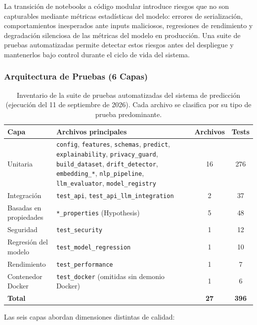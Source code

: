 \documentclass[12pt,letterpaper]{report}
\begin{document}
La transición de notebooks a código modular introduce riesgos que no son capturables mediante métricas estadísticas del modelo: errores de serialización, comportamientos inesperados ante inputs maliciosos, regresiones de rendimiento y degradación silenciosa de las métricas del modelo en producción. Una suite de pruebas automatizadas permite detectar estos riesgos antes del despliegue y mantenerlos bajo control durante el ciclo de vida del sistema.

\subsubsection{Arquitectura de Pruebas (6 Capas)}

\begin{table}[H]
\centering
\caption{Inventario de la suite de pruebas automatizadas del sistema de predicción
(ejecución del 11 de septiembre de 2026). Cada archivo se clasifica por su tipo de
prueba predominante.}
\label{tab:testing_suite}
\small
\begin{tabular}{@{}lp{6.3cm}cc@{}}
\toprule
\textbf{Capa} & \textbf{Archivos principales} & \textbf{Archivos} & \textbf{Tests} \\
\midrule
Unitaria & \texttt{config}, \texttt{features}, \texttt{schemas},
\texttt{predict}, \texttt{explainability}, \texttt{privacy\_guard},
\texttt{build\_dataset}, \texttt{drift\_detector}, \texttt{embedding\_*},
\texttt{nlp\_pipeline}, \texttt{llm\_evaluator}, \texttt{model\_registry} & 16 & 276 \\
Integración & \texttt{test\_api}, \texttt{test\_api\_llm\_integration} & 2 & 37 \\
Basadas en propiedades & \texttt{*\_properties} (Hypothesis) & 5 & 48 \\
Seguridad & \texttt{test\_security} & 1 & 12 \\
Regresión del modelo & \texttt{test\_model\_regression} & 1 & 10 \\
Rendimiento & \texttt{test\_performance} & 1 & 7 \\
Contenedor Docker & \texttt{test\_docker} (omitidas sin demonio Docker) & 1 & 6 \\
\midrule
\textbf{Total} & & \textbf{27} & \textbf{396} \\
\bottomrule
\end{tabular}
\end{table}

Las seis capas abordan dimensiones distintas de calidad:
\end{document}
